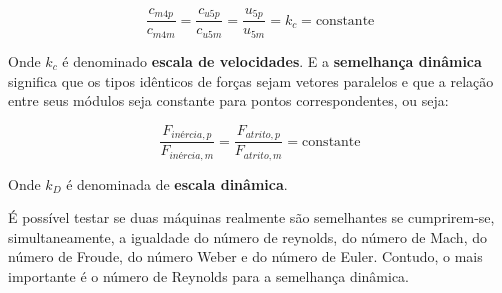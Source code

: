    \begin{equation}
    \frac{c_{m4p}}{c_{m4m}} = \frac{c_{u5p}}{c_{u5m}} = \frac{u_{5p}}{u_{5m}} = k_c = \mbox{constante}     \end{equation}

    Onde $k_c$ é denominado \textbf{escala de velocidades}. E a \textbf{semelhança dinâmica} significa que os tipos idênticos de forças sejam vetores paralelos e que a relação entre seus módulos seja constante para pontos correspondentes, ou seja:

    \begin{equation}
        \frac{F_{inércia,p}}{F_{inércia,m}} = \frac{F_{atrito,p}}{F_{atrito,m}} = \mbox{constante}
    \end{equation}

    Onde $k_D$ é denominada de \textbf{escala dinâmica}.

    É possível testar se duas máquinas realmente são semelhantes se cumprirem-se, simultaneamente, a igualdade do número de reynolds, do número de Mach, do número de Froude, do número Weber e do número de Euler. Contudo, o mais importante é o número de Reynolds para a semelhança dinâmica.

